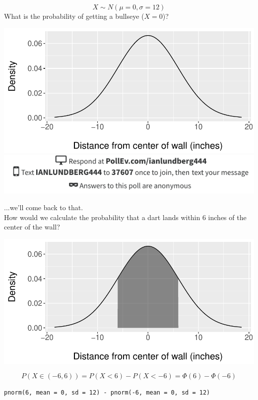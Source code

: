 \documentclass{beamer}
\begin{document}
\begin{frame}
$$X\sim N(\mu = 0, \sigma = 12)$$
What is the probability of getting a bullseye ($X=0$)?
\\
\begin{center}
\includegraphics[scale=.5]{figures/Normal0.pdf} \\
\includegraphics[scale=.4]{figures/Bullseye_Poll.png}
\end{center}
\end{frame}

\begin{frame}
...we'll come back to that. \\
How would we calculate the probability that a dart lands within 6 inches of the center of the wall?
\pause
\begin{center}\includegraphics[scale=.6]{figures/Normal1.pdf}
\end{center}
\pause
$$P(X\in(-6,6)) = P(X<6)-P(X<-6) = \Phi(6) - \Phi(-6)$$
\pause
\begin{footnotesize}\texttt{pnorm(6, mean = 0, sd = 12) - pnorm(-6, mean = 0, sd = 12)}\end{footnotesize}
\end{frame}
\end{document}
